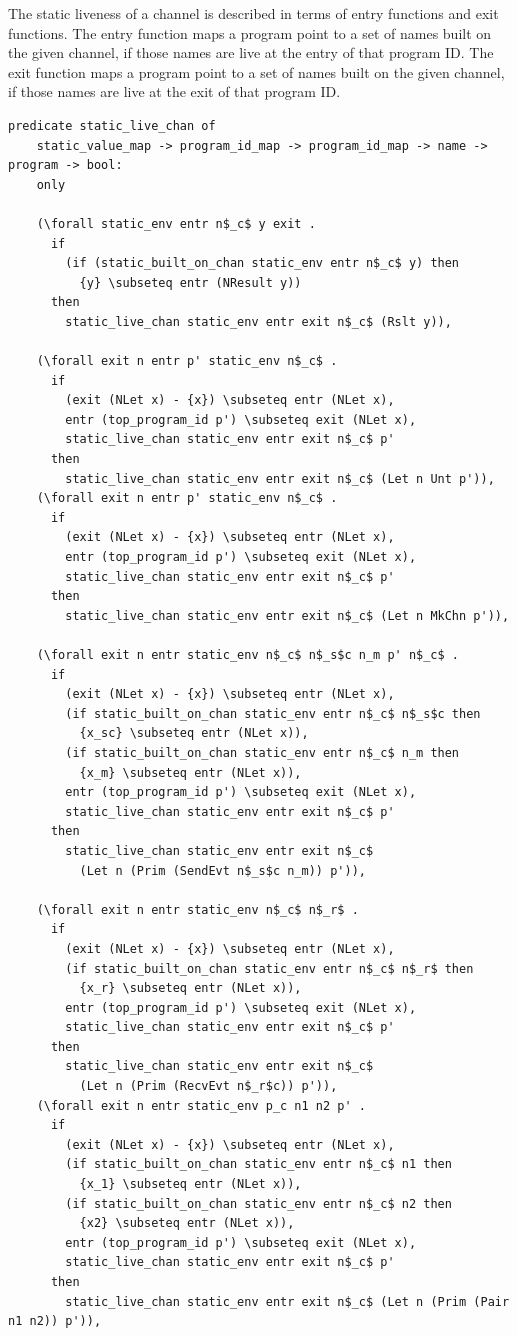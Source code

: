\documentclass{article}
\begin{document}
The static liveness of a channel is described in terms of entry functions and
exit functions. The entry function maps a program point to a set of names built on
the given channel, if those names are live at the entry of that program ID.
The exit function maps a program point to a
set of names built on the given channel, if those names are live at the exit of that
program ID.

\begin{lstlisting}[language=logic, mathescape]
  predicate static_live_chan of
    static_value_map -> program_id_map -> program_id_map -> name -> program -> bool:
    only

    (\forall static_env entr n$_c$ y exit .
      if
        (if (static_built_on_chan static_env entr n$_c$ y) then
          {y} \subseteq entr (NResult y))
      then
        static_live_chan static_env entr exit n$_c$ (Rslt y)),

    (\forall exit n entr p' static_env n$_c$ .
      if 
        (exit (NLet x) - {x}) \subseteq entr (NLet x),
        entr (top_program_id p') \subseteq exit (NLet x),
        static_live_chan static_env entr exit n$_c$ p'
      then 
        static_live_chan static_env entr exit n$_c$ (Let n Unt p')),
    (\forall exit n entr p' static_env n$_c$ .
      if
        (exit (NLet x) - {x}) \subseteq entr (NLet x),
        entr (top_program_id p') \subseteq exit (NLet x),
        static_live_chan static_env entr exit n$_c$ p'
      then 
        static_live_chan static_env entr exit n$_c$ (Let n MkChn p')),

    (\forall exit n entr static_env n$_c$ n$_s$c n_m p' n$_c$ .
      if
        (exit (NLet x) - {x}) \subseteq entr (NLet x),
        (if static_built_on_chan static_env entr n$_c$ n$_s$c then
          {x_sc} \subseteq entr (NLet x)),
        (if static_built_on_chan static_env entr n$_c$ n_m then 
          {x_m} \subseteq entr (NLet x)),
        entr (top_program_id p') \subseteq exit (NLet x),
        static_live_chan static_env entr exit n$_c$ p'
      then
        static_live_chan static_env entr exit n$_c$
          (Let n (Prim (SendEvt n$_s$c n_m)) p')),

    (\forall exit n entr static_env n$_c$ n$_r$ .    
      if
        (exit (NLet x) - {x}) \subseteq entr (NLet x),
        (if static_built_on_chan static_env entr n$_c$ n$_r$ then
          {x_r} \subseteq entr (NLet x)),
        entr (top_program_id p') \subseteq exit (NLet x),
        static_live_chan static_env entr exit n$_c$ p'
      then
        static_live_chan static_env entr exit n$_c$
          (Let n (Prim (RecvEvt n$_r$c)) p')),
    (\forall exit n entr static_env p_c n1 n2 p' .
      if
        (exit (NLet x) - {x}) \subseteq entr (NLet x),
        (if static_built_on_chan static_env entr n$_c$ n1 then
          {x_1} \subseteq entr (NLet x)),
        (if static_built_on_chan static_env entr n$_c$ n2 then
          {x2} \subseteq entr (NLet x)),
        entr (top_program_id p') \subseteq exit (NLet x),
        static_live_chan static_env entr exit n$_c$ p'
      then
        static_live_chan static_env entr exit n$_c$ (Let n (Prim (Pair n1 n2)) p')),


\end{lstlisting}
\end{document}
